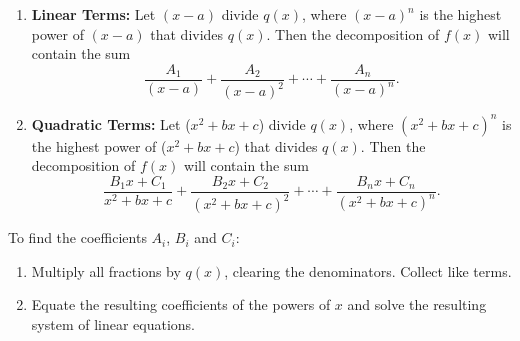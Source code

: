 \begin{enumerate}
	\item	\textbf{Linear Terms:} Let $(x-a)$ divide $q(x)$, where $(x-a)^n$ is the highest power of $(x-a)$ that divides $q(x)$. Then the decomposition of $f(x)$ will contain the sum
	$$\frac{A_1}{(x-a)} + \frac{A_2}{(x-a)^2} + \cdots +\frac{A_n}{(x-a)^n}.$$
	\item		\textbf{Quadratic Terms:} Let ($x^2+bx+c$) divide $q(x)$, where $(x^2+bx+c)^n$ is the highest power of ($x^2+bx+c$) that divides $q(x)$. Then the decomposition of $f(x)$ will contain the sum 
	$$\frac{B_1x+C_1}{x^2+bx+c}+\frac{B_2x+C_2}{(x^2+bx+c)^2}+\cdots+\frac{B_nx+C_n}{(x^2+bx+c)^n}.$$
	\end{enumerate}
	To find the coefficients $A_i$, $B_i$ and $C_i$:
	\begin{enumerate}
	\item	Multiply all fractions by $q(x)$, clearing the denominators. Collect like terms.
	\item		Equate the resulting coefficients of the powers of $x$ and solve the resulting system of linear equations.
	\end{enumerate}

